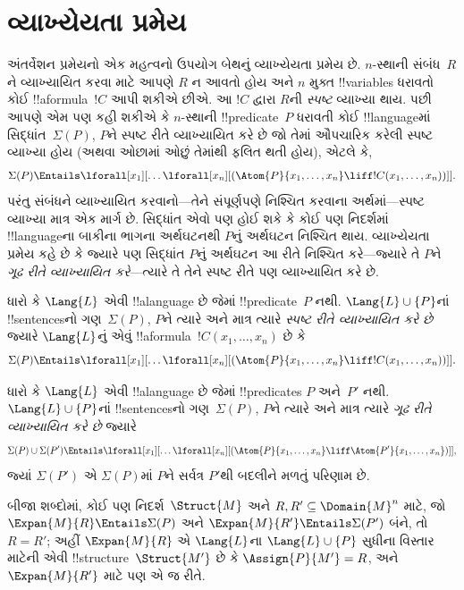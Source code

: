 \documentclass[../../../include/open-logic-section]{subfiles}
\begin{document}

\section{વ્યાખ્યેયતા પ્રમેય}

અંતર્વેશન પ્રમેયનો એક મહત્વનો ઉપયોગ બેથનું વ્યાખ્યેયતા પ્રમેય છે.
$n$-સ્થાની સંબંધ~$R$ને વ્યાખ્યાયિત કરવા માટે આપણે $R$ ન આવતો હોય
અને $n$ મુક્ત !!{variable}s ધરાવતો કોઈ !!a{formula}~$!C$ આપી શકીએ
છીએ. આ $!C$ દ્વારા $R$ની \emph{સ્પષ્ટ} વ્યાખ્યા થાય. પછી આપણે એમ
પણ કહી શકીએ કે $n$-સ્થાની !!{predicate}~$P$ ધરાવતી કોઈ !!{language}માં
સિદ્ધાંત~$\Sigma(P)$, $P$ને સ્પષ્ટ રીતે વ્યાખ્યાયિત કરે છે જો તેમાં
ઔપચારિક કરેલી સ્પષ્ટ વ્યાખ્યા હોય (અથવા ઓછામાં ઓછું તેમાંથી ફલિત થતી
હોય), એટલે કે,
\[
\Sigma(P) \Entails \lforall[x_1][\dots
  \lforall[x_n][(\Atom{P}{x_1,\dots, x_n} \liff !C(x_1, \dots,
    x_n))]].
\]
પરંતુ સંબંધને વ્યાખ્યાયિત કરવાનો---તેને સંપૂર્ણપણે નિશ્ચિત કરવાના
અર્થમાં---સ્પષ્ટ વ્યાખ્યા માત્ર એક માર્ગ છે. સિદ્ધાંત એવો પણ હોઈ શકે
કે કોઈ પણ નિદર્શમાં !!{language}ના બાકીના ભાગના અર્થઘટનથી $P$નું
અર્થઘટન નિશ્ચિત થાય. વ્યાખ્યેયતા પ્રમેય કહે છે કે જ્યારે પણ સિદ્ધાંત
$P$નું અર્થઘટન આ રીતે નિશ્ચિત કરે---જ્યારે તે $P$ને \emph{ગૂઢ રીતે
વ્યાખ્યાયિત કરે}---ત્યારે તે તેને સ્પષ્ટ રીતે પણ વ્યાખ્યાયિત કરે છે.

\begin{defn}
ધારો કે $\Lang{L}$ એવી !!a{language} છે જેમાં !!{predicate}~$P$ નથી.
$\Lang{L}\cup\{P\}$નાં !!{sentence}sનો ગણ~$\Sigma(P)$, $P$ને ત્યારે
અને માત્ર ત્યારે \emph{સ્પષ્ટ રીતે વ્યાખ્યાયિત કરે છે} જ્યારે
$\Lang{L}$નું એવું !!a{formula}~$!C(x_1,\dots,x_n)$ છે કે
\[
\Sigma(P) \Entails \lforall[x_1][\dots
  \lforall[x_n][(\Atom{P}{x_1,\dots, x_n} \liff !C(x_1, \dots,
    x_n))]].
\]
\end{defn}

\begin{defn}
ધારો કે $\Lang{L}$ એવી !!a{language} છે જેમાં !!{predicate}s $P$
અને~$P'$ નથી. $\Lang{L}\cup\{P\}$નાં !!{sentence}sનો ગણ~$\Sigma(P)$,
$P$ને ત્યારે અને માત્ર ત્યારે \emph{ગૂઢ રીતે વ્યાખ્યાયિત કરે છે}
જ્યારે
\[
\Sigma(P) \cup \Sigma(P') \Entails \lforall[x_1][\dots
  \lforall[x_n][(\Atom{P}{x_1,\dots, x_n} \liff \Atom{P'}{x_1,\dots,
      x_n})]],
\]
જ્યાં $\Sigma(P')$ એ $\Sigma(P)$માં $P$ને સર્વત્ર $P'$થી બદલીને
મળતું પરિણામ છે.
\end{defn}

બીજા શબ્દોમાં, કોઈ પણ નિદર્શ~$\Struct{M}$ અને $R,R'\subseteq
\Domain{M}^n$ માટે, જો $\Expan{M}{R}\Entails\Sigma(P)$ અને
$\Expan{M}{R'}\Entails\Sigma(P')$ બંને, તો $R=R'$; અહીં
$\Expan{M}{R}$ એ $\Lang{L}$ના $\Lang{L}\cup\{P\}$ સુધીના વિસ્તાર
માટેની એવી !!{structure}~$\Struct{M'}$ છે કે $\Assign{P}{M'}=R$, અને
$\Expan{M}{R'}$ માટે પણ એ જ રીતે.
\end{document}
